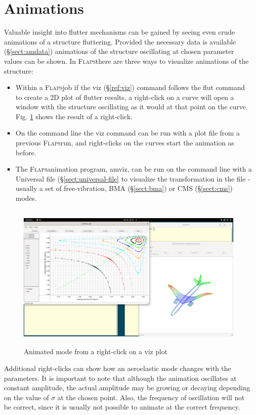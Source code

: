 \documentclass[11pt,openany,twoside]{book}
\numberwithin{equation}{section}		%
\newcommand{\Cmd}[1]{{\sf #1}}
\newcommand{\Flaps}{\textsc{Flaps\:}}
\newcommand{\Sectref}[1]{\S\ref{#1}}
\newcommand{\Figref}[1]{Fig. \ref{#1}}  %
\begin{document}
\section{Animations}\label{sect:animation}
Valuable insight into flutter mechanisms can be gained by seeing
even crude animations of a structure fluttering.
Provided the necessary data is available (\Sectref{sect:amdata}) animations
of the structure oscillating at chosen parameter values can be shown.
In \Flaps there are three ways to visualize animations of the structure:
\begin{itemize}
	\item Within a \Flaps job if the \Cmd{viz} (\Sectref{ref:viz})
	   command follows the \Cmd{flut} command to create a 2D plot of flutter
		results, a right-click on a curve will open a window with the structure
		oscillating as it would at that point on the curve.
		\Figref{fig:viz-amviz} shows the result of a right-click.
	\item On the command line the \Cmd{viz} command can be run
		with a plot file from a previous \Flaps run, and right-clicks
		on the curves start the animation as before.
	\item The \Flaps animation program, \Cmd{amviz}, can be run
		on the command line with a Universal file (\Sectref{sect:universal-file}
		to visualize the transformation in the file - usually a set of free-vibration,
		BMA (\Sectref{sect:bma}) or CMS (\Sectref{sect:cms}) modes.
\end{itemize}
\begin{figure}[ht] 	%
		\includegraphics[height=7.2cm,width=13cm]{viz-amviz.png}
	\centering
	\caption{Animated mode from a right-click on a \Cmd{viz} plot}\label{fig:viz-amviz}
\end{figure}
Additional right-clicks can show how an aeroelastic mode changes with the parameters.
It is important to note that although the animation oscillates at
constant amplitude, the actual amplitude may be growing or decaying
depending on the value of $\sigma$ at the chosen point.
Also, the frequency of oscillation will not be correct, since it
is usually not possible to animate at the correct frequency.
\end{document}
